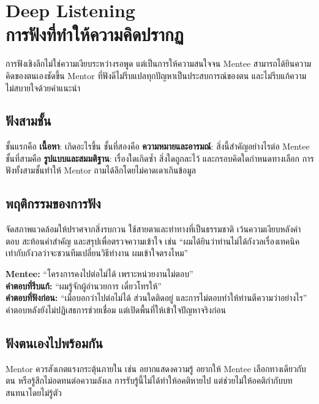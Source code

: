 \chapter{Deep Listening\\การฟังที่ทำให้ความคิดปรากฏ}

การฟังเชิงลึกไม่ใช่ความเงียบระหว่างรอพูด แต่เป็นการให้ความสนใจจน Mentee สามารถได้ยินความคิดของตนเองชัดขึ้น Mentor ที่ฟังดีไม่รีบแปลทุกปัญหาเป็นประสบการณ์ของตน และไม่รีบแก้ความไม่สบายใจด้วยคำแนะนำ


\section{ฟังสามชั้น}
ชั้นแรกคือ \textbf{เนื้อหา}: เกิดอะไรขึ้น ชั้นที่สองคือ \textbf{ความหมายและอารมณ์}: สิ่งนี้สำคัญอย่างไรต่อ Mentee ชั้นที่สามคือ \textbf{รูปแบบและสมมติฐาน}: เรื่องใดเกิดซ้ำ สิ่งใดถูกละไว้ และกรอบคิดใดกำหนดทางเลือก การฟังทั้งสามชั้นทำให้ Mentor ถามได้ลึกโดยไม่คาดเดาเกินข้อมูล

\section{พฤติกรรมของการฟัง}
จัดสภาพแวดล้อมให้ปราศจากสิ่งรบกวน ใช้สายตาและท่าทางที่เป็นธรรมชาติ เว้นความเงียบหลังคำตอบ สะท้อนคำสำคัญ และสรุปเพื่อตรวจความเข้าใจ เช่น \enquote{ผมได้ยินว่าท่านไม่ได้กังวลเรื่องเทคนิคเท่ากับกังวลว่าจะชวนทีมเปลี่ยนวิธีทำงาน ผมเข้าใจตรงไหม}

\begin{examplebox}
\textbf{Mentee:} \enquote{โครงการคงไปต่อไม่ได้ เพราะหน่วยงานไม่ตอบ}\\
\textbf{คำตอบที่รีบแก้:} \enquote{ผมรู้จักผู้อำนวยการ เดี๋ยวโทรให้}\\
\textbf{คำตอบที่ฟังก่อน:} \enquote{เมื่อบอกว่าไปต่อไม่ได้ ส่วนใดติดอยู่ และการไม่ตอบทำให้ท่านตีความว่าอย่างไร}\\
คำตอบหลังยังไม่ปฏิเสธการช่วยเชื่อม แต่เปิดพื้นที่ให้เข้าใจปัญหาจริงก่อน
\end{examplebox}

\section{ฟังตนเองไปพร้อมกัน}
Mentor ควรสังเกตแรงกระตุ้นภายใน เช่น อยากแสดงความรู้ อยากให้ Mentee เลือกทางเดียวกับตน หรือรู้สึกไม่อดทนต่อความลังเล การรับรู้นี้ไม่ได้ทำให้อคติหายไป แต่ช่วยไม่ให้อคติกำกับบทสนทนาโดยไม่รู้ตัว

